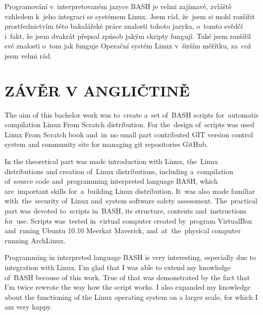 \documentclass[a4paper,12pt]{article}
\newcommand{\nn}[1]{\clearpage\section*{\texorpdfstring{\uppercase{#1}}{#1}}\addcontentsline{toc}{section}{\uppercase{#1}}}%
\begin{document}
Programování v~interpretovaném jazyce BASH je velmi zajímavé, zvláště vzhledem k~jeho integraci se systémem Linux. Jsem rád, že~jsem si mohl rozšířit prostřednictvím této bakalářské práce znalosti tohoto jazyka, o~tomto svědčí i~fakt, že jsem dvakrát přepsal způsob jakým skripty fungují. Také jsem rozšířil své znalosti o~tom jak funguje Operační systém Linux v~širším měřítku, za~což jsem velmi rád.
\newpage
\nn{Závěr v Angličtině}
The aim of this bachelor work was to~create a~set of~BASH scripts for~automatic compilation Linux From Scratch distribution. For the~design of~scripts was used Linux From Scratch book and~in~no small part contributed GIT version control system and community site for managing git repositories GitHub. 

In the theoretical part was made introduction with Linux, the~Linux distributions and creation of~Linux distributions, including a~compilation of~source code and~programming interpreted language BASH, which are~important skills for~a~building Linux distribution. It~was also made familiar with~the~security of~Linux and~system software safety assessment. The~practical part was devoted to~scripts in~BASH, its structure, contents and~instructions for~use. Scripts was~tested in~virtual computer created by~program VirtualBox and~runing Ubuntu 10.10 Meerkat Maverick, and~at~the~physical computer running ArchLinux. 

Programming in interpreted language BASH is very interesting, especially due to integration with Linux. I'm glad that I was able to extend my knowledge of~BASH becouse of this work. True of that was demonstrated by the fact that I'm twice rewrote the way how the script works. I also expanded my knowledge about the functioning of the Linux operating system on a larger scale, for which I am very happy.
\end{document}
